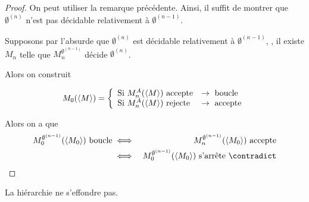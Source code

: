 \begin{proof}
	On peut utiliser la remarque précédente. Ainsi, il suffit de montrer que $\emptyset^{(n)}$ n'est pas décidable relativement à $\emptyset^{(n-1)}$.

	Supposons par l'absurde que $\emptyset^{(n)}$ est décidable relativement à $\emptyset^{(n-1)}$, \ie, il existe $M_n$ telle que $M_n^{\emptyset^{(n-1)}}$ décide $\emptyset^{(n)}$.

	Alors on construit

	$$
		M_0(\left\langle M\right\rangle) =
		\left\{
		\begin{array}{ll}
			\text{Si } M_n^A(\left\langle M\right\rangle) \text{ accepte} & \rightarrow \text{ boucle}  \\
			\text{Si } M_n^A(\left\langle M\right\rangle) \text{ rejecte} & \rightarrow \text{ accepte} \\
		\end{array}
		\right.
	$$

	Alors on a que
	\begin{eqnarray*}
		M_0^{\emptyset^{(n-1)}}(\encode{M_0}) \text{ boucle} &\iff& M_n^{\emptyset^{(n-1)}} (\encode {M_0}) \text{ accepte} \\
		&\iff& M_0^{\emptyset^{(n-1)}}(\encode{M_0}) \text{ s'arrête} \ \contradict
	\end{eqnarray*}
\end{proof}


\begin{coro}
	La hiérarchie ne s'effondre pas.
\end{coro}
